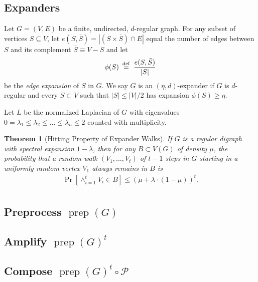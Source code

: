 \documentclass{article}
\newtheorem{theorem}{Theorem}
\newcommand{\prep}{{\operatorname{prep}}}
\newcommand{\eqdef}{\mathbin{\stackrel{\rm def}{=}}}
\begin{document}
\subsection{Expanders}

Let $G = (V, E)$ be a finite, undirected, $d$-regular graph.
For any subset of vertices $S \subseteq V$,
let $e(S, \bar{S}) = |(S\times \bar{S})\cap E|$ equal the number of edges
between $S$ and its complement $\bar{S} \equiv V - S$ and
let
\begin{align*}
\phi(S) \;\eqdef\; \frac{e(S, \bar{S})}{|S|} %
\end{align*}
be the \emph{edge expansion} of $S$ in $G$.
We say $G$ is an $(\eta, d)$-expander if $G$ is $d$-regular and
every $S \subset V$ such that $|S| \le |V|/2$ has expansion $\phi(S) \ge \eta$.

Let $L$ be the normalized Laplacian of $G$ with eigenvalues
$0 = \lambda_1 \le \lambda_2 \le \dots \le \lambda_n \le 2$
counted with multiplicity.

\begin{theorem}[Hitting Property of Expander Walks]
If $G$ is a regular digraph with spectral expansion $1 - \lambda$, then for any $B \subset V(G)$
of density $\mu$, the probability that a random walk $(V_1, \dots, V_t)$ of $t - 1$
steps in $G$ starting in a uniformly random vertex $V_1$ always remains in $B$ is
\begin{align*}
\Pr\left[\wedge_{i=1}^t V_i \in B\right] \le (\mu + \lambda \cdot (1 - \mu))^t.\\
\end{align*}
\end{theorem}

\subsection{Preprocess $\prep(G)$}

\subsection{Amplify $\prep(G)^t$}

\subsection{Compose $\prep(G)^t \circ \mathcal{P}$}



\end{document}
